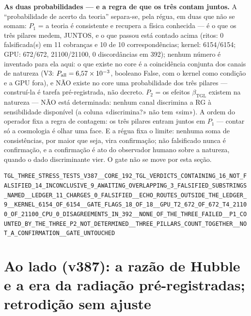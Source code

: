 \documentclass[11pt]{article}
\newcommand{\bTGL}{\beta_{\mathrm{TGL}}}\newcommand{\Msun}{M_{\odot}}\newcommand{\TGL}{\mathrm{TGL}}
\theoremstyle{definition}\newtheorem{deriv}{Derivação}
\begin{document}
\textbf{As duas probabilidades --- e a regra de que os três contam juntos.} A ``probabilidade de acerto da teoria'' separa-se, pela régua, em duas que não se somam: $P_1$ = a teoria é consistente e recupera a física conhecida --- é o que os três pilares medem, JUNTOS, e o que passou está contado acima (ritos: 0 falsificada(s) em 11 cobranças e 10 de 10 correspondências; kernel: 6154/6154; GPU: 672/672, 21100/21100, 0 discordâncias em 392); nenhum número é inventado para ela aqui: o que existe no core é a coincidência conjunta dos canais de natureza (V3: $P_{\rm all}=6{,}57\times10^{-3}$, booleano False, com o kernel como condição e a GPU fora), e NÃO existe no core uma probabilidade dos três pilares --- construí-la é tarefa pré-registrada, não decreto. $P_2$ = os efeitos $\bTGL$ existem na natureza --- NÃO está determinada: nenhum canal discrimina a RG à sensibilidade disponível (a coluna «discrimina?» não tem «sim»). A ordem do operador fixa a regra de contagem: os três pilares entram juntos em $P_1$ --- contar só a cosmologia é olhar uma face. E a régua fixa o limite: nenhuma soma de consistências, por maior que seja, vira confirmação; não falsificado nunca é confirmação, e a confirmação é ato do observador humano sobre a natureza, quando o dado discriminante vier. O gate não se move por esta seção.

\begin{center}\small\texttt{TGL\_THREE\_STRESS\_TESTS\_V387\_\_CORE\_192\_TGL\_VERDICTS\_CONTAINING\_16\_NOT\_FALSIFIED\_14\_INCONCLUSIVE\_9\_AWAITING\_OVERLAPPING\_3\_FALSIFIED\_SUBSTRINGS\_NAMED\_\_LEDGER\_11\_CHARGES\_0\_FALSIFIED\_\_ECHO\_ROUTES\_OUTSIDE\_THE\_LEDGER\_9\_\_KERNEL\_6154\_OF\_6154\_\_GATE\_FLAGS\_18\_OF\_18\_\_GPU\_T2\_672\_OF\_672\_T4\_21100\_OF\_21100\_CPU\_0\_DISAGREEMENTS\_IN\_392\_\_NONE\_OF\_THE\_THREE\_FAILED\_\_P1\_COUNTED\_BY\_THE\_THREE\_P2\_NOT\_DETERMINED\_\_THREE\_PILLARS\_COUNT\_TOGETHER\_\_NOT\_A\_CONFIRMATION\_\_GATE\_UNTOUCHED}\end{center}

\section*{Ao lado (v387): a razão de Hubble e a era da radiação pré-registradas; retrodição sem ajuste}

\end{document}
